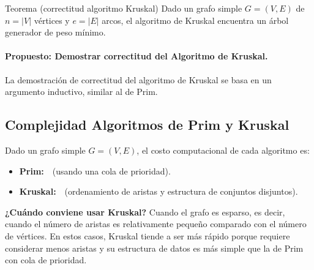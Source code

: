 






\begin{thmblock}{Teorema (correctitud algoritmo Kruskal)}
Dado un grafo simple $G=(V,E)$ de $n=|V|$ vértices y $e=|E|$ arcos, 
  el algoritmo de Kruskal encuentra un árbol generador de peso mínimo.
\end{thmblock}

\paragraph{Propuesto: Demostrar correctitud del Algoritmo de Kruskal.}
La demostración de correctitud del algoritmo de Kruskal se basa en un argumento inductivo, similar al de Prim.

\subsection{Complejidad Algoritmos de Prim y Kruskal}

Dado un grafo simple $G = (V, E)$, el costo computacional de cada algoritmo es:

\begin{itemize}
  \item \textbf{Prim:}  \,\, (usando una cola de prioridad).
  \item \textbf{Kruskal:}  \,\, (ordenamiento de aristas y estructura de conjuntos disjuntos).
\end{itemize}


\textbf{¿Cuándo conviene usar Kruskal?} Cuando el grafo es esparso, es decir, cuando el número de aristas es relativamente pequeño comparado con el número de vértices. En estos casos, Kruskal tiende a ser más rápido porque requiere considerar menos aristas y su estructura de datos es más simple que la de Prim con cola de prioridad.

